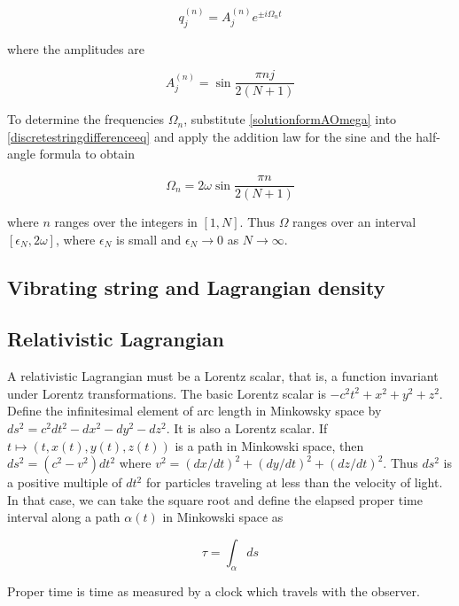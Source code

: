 \begin{equation}
\label{solutionformAOmega}
q_j^{(n)} = A_j^{(n)} e^{\pm i \Omega_n t}
\end{equation}

where the amplitudes are

\begin{equation}
A_j^{(n)} = \sin \frac{\pi n j}{2(N+1)}
\end{equation}

To determine the frequencies $\Omega_n$, substitute  \eqref{solutionformAOmega} into \eqref{discretestringdifferenceeq} and apply the addition law for the sine and the half-angle formula to obtain

\begin{equation}
\Omega_n = 2\omega\sin \frac{\pi n}{2(N+1)}
\end{equation}

where $n$ ranges over the integers in $[1,N]$.  Thus $\Omega$  ranges over an interval $[\epsilon_N, 2\omega]$, where $\epsilon_N$ is small and $\epsilon_N \to 0$ as $N \to \infty$.

\subsection{Vibrating string and Lagrangian density}


\subsection{Relativistic Lagrangian}

A relativistic Lagrangian must be  a Lorentz scalar, that is, a function invariant under Lorentz transformations.  The basic Lorentz scalar is $-c^2 t^2 +x^2 + y^2 + z^2$.  Define the infinitesimal element of arc length in Minkowsky space  by $ds^2 = c^2 dt^2 - dx^2 - dy^2 - dz^2$.  It is also a Lorentz scalar. If $t \mapsto (t,x(t), y(t), z(t))$ is a path in Minkowski space, then $ds^2 = (c^2 - v^2)dt^2$ where 
$v^2 = (dx/dt)^2 + (dy/dt)^2 + (dz/dt)^2$. Thus $ds^2$ is a positive multiple of $dt^2$ for particles traveling at less than the velocity of light.  In that case, we can take the square root and define the elapsed proper time interval along a path $\alpha(t)$ in Minkowski space as

\begin{equation}
\label{relativisticaction}
  \tau = \int_\alpha ds
\end{equation}

Proper time is time as measured by a clock which travels with the observer.  

